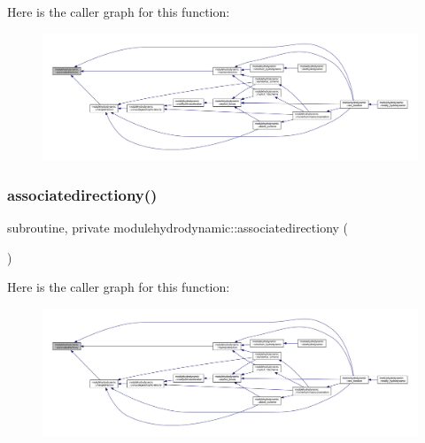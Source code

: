 Here is the caller graph for this function\+:\nopagebreak
\begin{figure}[H]
\begin{center}
\leavevmode
\includegraphics[width=350pt]{namespacemodulehydrodynamic_a46e9869092f2ae2a7161f224fb8929e7_icgraph}
\end{center}
\end{figure}
\mbox{\label{namespacemodulehydrodynamic_ad1dd8c0a50f0deaee0d084b9938b1361}} 
\subsubsection{\texorpdfstring{associatedirectiony()}{associatedirectiony()}}
{\footnotesize\ttfamily subroutine, private modulehydrodynamic\+::associatedirectiony (\begin{DoxyParamCaption}{ }\end{DoxyParamCaption})\hspace{0.3cm}{\ttfamily [private]}}

Here is the caller graph for this function\+:\nopagebreak
\begin{figure}[H]
\begin{center}
\leavevmode
\includegraphics[width=350pt]{namespacemodulehydrodynamic_ad1dd8c0a50f0deaee0d084b9938b1361_icgraph}
\end{center}
\end{figure}
\mbox{\label{namespacemodulehydrodynamic_a560d4076559adb32fe2884f63e0b13da}} 
